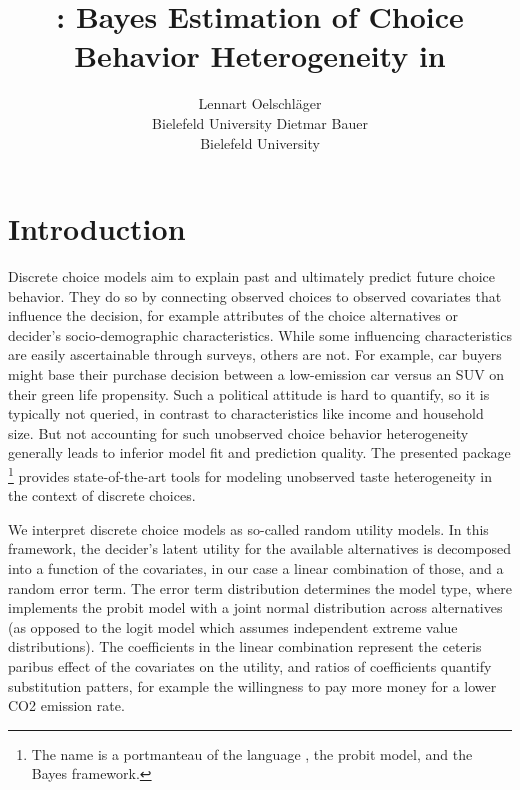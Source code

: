 \documentclass[article,shortnames]{jss}
\author{Lennart Oelschl\"ager \\Bielefeld University \And Dietmar Bauer\\Bielefeld University}
\title{\pkg{RprobitB}: Bayes Estimation of Choice Behavior Heterogeneity in \proglang{R}}
\newcommand{\fct}[1]{\code{#1()}}
\begin{document}



\section{Introduction}
\label{sec:introduction}

Discrete choice models aim to explain past and ultimately predict future choice behavior. They do so by connecting observed choices to observed covariates that influence the decision, for example attributes of the choice alternatives or decider's socio-demographic characteristics. While some influencing characteristics are easily ascertainable through surveys, others are not. For example, car buyers might base their purchase decision between a low-emission car versus an SUV on their green life propensity. Such a political attitude is hard to quantify, so it is typically not queried, in contrast to characteristics like income and household size. But not accounting for such unobserved choice behavior heterogeneity generally leads to inferior model fit and prediction quality. The presented  package \footnote{The name  is a portmanteau of the language , the probit model, and the Bayes framework.} \citep{Oelschlaeger:2021} provides state-of-the-art tools for modeling unobserved taste heterogeneity in the context of discrete choices.

We interpret discrete choice models as so-called random utility models. In this framework, the decider's latent utility for the available alternatives is decomposed into a function of the covariates, in our case a linear combination of those, and a random error term. The error term distribution determines the model type, where  implements the probit model with a joint normal distribution across alternatives (as opposed to the logit model which assumes independent extreme value distributions). The coefficients in the linear combination represent the ceteris paribus effect of the covariates on the utility, and ratios of coefficients quantify substitution patters, for example the willingness to pay more money for a lower CO2 emission rate.
\end{document}
